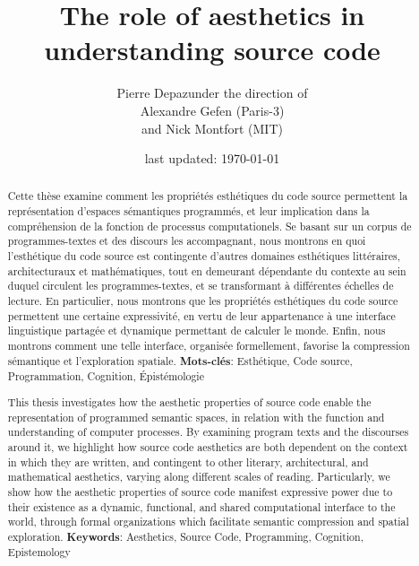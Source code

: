 \documentclass{report}
\begin{document}
\title{The role of aesthetics in understanding source code}
\author{Pierre Depaz\linebreak\linebreak under the direction of\\Alexandre Gefen (Paris-3)\\and Nick Montfort (MIT)}
\date{last updated: \today}
\maketitle

\renewcommand{\abstractname}{Résumé}
\begin{abstract}
    Cette thèse examine comment les propriétés esthétiques du code source permettent la représentation d'espaces sémantiques programmés, et leur implication dans la compréhension de la fonction de processus computationels. Se basant sur un corpus de programmes-textes et des discours les accompagnant, nous montrons en quoi l'esthétique du code source est contingente d'autres domaines esthétiques littéraires, architecturaux et mathématiques, tout en demeurant dépendante du contexte au sein duquel circulent les programmes-textes, et se transformant à différentes échelles de lecture. En particulier, nous montrons que les propriétés esthétiques du code source permettent une certaine expressivité, en vertu de leur appartenance à une interface linguistique partagée et dynamique permettant de calculer le monde. Enfin, nous montrons comment une telle interface, organisée formellement, favorise la compression sémantique et l'exploration spatiale.
    \linebreak
    \linebreak
    \textbf{Mots-clés}: Esthétique, Code source, Programmation, Cognition, Épistémologie
\end{abstract}

\renewcommand{\abstractname}{Summary}
\begin{abstract}
    This thesis investigates how the aesthetic properties of source code enable the representation of programmed semantic spaces, in relation with the function and understanding of computer processes. By examining program texts and the discourses around it, we highlight how source code aesthetics are both dependent on the context in which they are written, and contingent to other literary, architectural, and mathematical aesthetics, varying along different scales of reading. Particularly, we show how the aesthetic properties of source code manifest expressive power due to their existence as a dynamic, functional, and shared computational interface to the world, through formal organizations which facilitate semantic compression and spatial exploration.
    \linebreak
    \linebreak
    \textbf{Keywords}: Aesthetics, Source Code, Programming, Cognition, Epistemology
\end{abstract}
\end{document}
